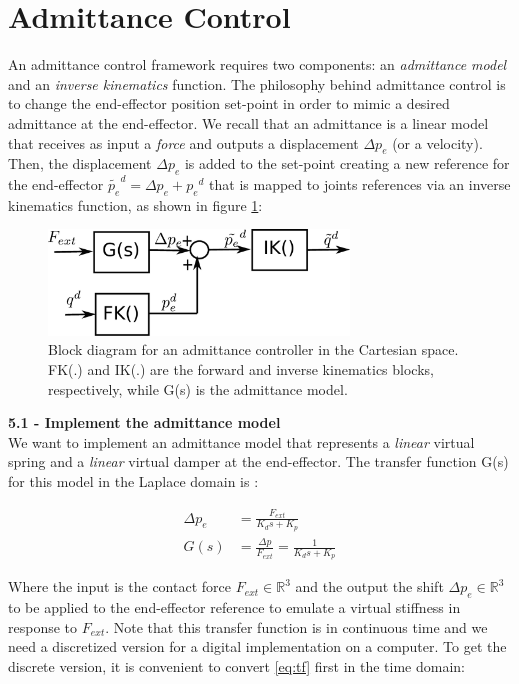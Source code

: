 \documentclass[11pt]{article}
\newcommand{\Rnum}{\mathbb{R}} %
\begin{document}
\section{Admittance Control}
An admittance control framework requires two components: an \textit{admittance model} and an \textit{inverse kinematics} function.
The philosophy behind admittance control is to change the end-effector position set-point in order to mimic a desired admittance at the end-effector. We recall that an admittance is a linear model that receives  as input a \textit{force} and outputs a displacement $\Delta p_e$ (or a velocity). Then, the displacement $\Delta p_e$ is added to the set-point creating a new reference for the end-effector $\tilde{p_e}^d = \Delta p_e + {p_e}^d$  that is mapped to joints references via an inverse kinematics function, as shown in figure \ref{fig:admittance}:

\begin{figure}[bht]
	\centering
	\includegraphics[width=8cm]{admittanceControl.pdf}
	\caption{Block diagram for an admittance controller in the Cartesian space. FK(.) and IK(.) are the forward and inverse kinematics blocks, respectively, while G(s) is the admittance model.}
	\label{fig:admittance}
\end{figure}

\quad

\noindent
\textbf{5.1 - Implement the admittance model }\\
We want to implement an admittance model that represents a \textit{linear} virtual spring and a \textit{linear} virtual damper at the end-effector.
The transfer function G(s) for this model in the Laplace domain is :



\begin{align}
\label{eq:tf}
\Delta p_e &= \frac{ F_{ext} }{K_d s + K_p}\\
G(s)& = \frac{\Delta p}{F_{ext}} = \frac{ 1 }{K_d s + K_p} \nonumber
\end{align}


Where the input is the contact force $F_{ext}\in \Rnum^3$ and the output the shift  $\Delta p_e\in \Rnum^3$ to be applied to the end-effector reference to emulate a virtual stiffness in response to  $F_{ext}$. Note that this transfer function is in continuous time and we need a discretized version for a digital implementation on a computer. To get the discrete version, it is convenient to convert \eqref{eq:tf} first in the time domain:
\end{document}
